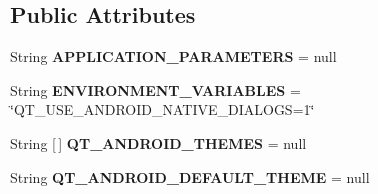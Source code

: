 \subsection*{Public Attributes}
\begin{DoxyCompactItemize}
\item 
\mbox{\label{classorg_1_1qtproject_1_1qt5_1_1android_1_1bindings_1_1_qt_activity_a1c6754715d370c1e91160c534c54a7e7}} 
String {\bfseries A\+P\+P\+L\+I\+C\+A\+T\+I\+O\+N\+\_\+\+P\+A\+R\+A\+M\+E\+T\+E\+RS} = null
\item 
\mbox{\label{classorg_1_1qtproject_1_1qt5_1_1android_1_1bindings_1_1_qt_activity_aa22d75fadcbc70bf4f5f668ea3300d6e}} 
String {\bfseries E\+N\+V\+I\+R\+O\+N\+M\+E\+N\+T\+\_\+\+V\+A\+R\+I\+A\+B\+L\+ES} = \char`\"{}Q\+T\+\_\+\+U\+S\+E\+\_\+\+A\+N\+D\+R\+O\+I\+D\+\_\+\+N\+A\+T\+I\+V\+E\+\_\+\+D\+I\+A\+L\+O\+GS=1\char`\"{}
\item 
\mbox{\label{classorg_1_1qtproject_1_1qt5_1_1android_1_1bindings_1_1_qt_activity_a0abec2a740bce96eec092bd1634d3a55}} 
String \mbox{[}$\,$\mbox{]} {\bfseries Q\+T\+\_\+\+A\+N\+D\+R\+O\+I\+D\+\_\+\+T\+H\+E\+M\+ES} = null
\item 
\mbox{\label{classorg_1_1qtproject_1_1qt5_1_1android_1_1bindings_1_1_qt_activity_a74c21dffcaf3af985a164068c278b979}} 
String {\bfseries Q\+T\+\_\+\+A\+N\+D\+R\+O\+I\+D\+\_\+\+D\+E\+F\+A\+U\+L\+T\+\_\+\+T\+H\+E\+ME} = null
\end{DoxyCompactItemize}
